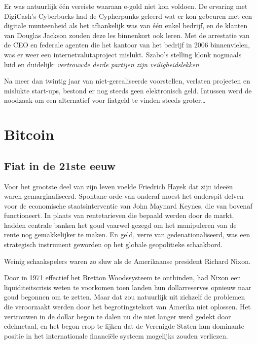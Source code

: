 \documentclass[
  a5paper,
  smalldemyvopaper,11pt,twoside,onecolumn,openright,extrafontsizes,
hidelinks]{memoir}
\begin{document}
Er was natuurlijk één vereiste waaraan e-gold niet kon voldoen. De
ervaring met DigiCash's Cyberbucks had de Cypherpunks geleerd wat er kon
gebeuren met een digitale munteenheid als het afhankelijk was van één
enkel bedrijf, en de klanten van Douglas Jackson zouden deze les
binnenkort ook leren. Met de arrestatie van de CEO en federale agenten
die het kantoor van het bedrijf in 2006 binnenvielen, was er weer een
internetvalutaproject mislukt. Szabo's stelling klonk nogmaals luid en
duidelijk: \emph{vertrouwde derde partijen zijn veiligheidslekken}.

Na meer dan twintig jaar van niet-gerealiseerde voorstellen, verlaten
projecten en mislukte start-ups, bestond er nog steeds geen elektronisch
geld. Intussen werd de noodzaak om een alternatief voor fiatgeld te vinden
steeds groter\ldots{}

\part{Bitcoin}

\chapter{Fiat in de 21ste eeuw}\label{fiat-in-de-21ste-eeuw}

Voor het grootste deel van zijn leven voelde Friedrich Hayek dat zijn
ideeën waren gemarginaliseerd. Spontane orde van onderaf moest het
onderspit delven voor de economische staatsinterventie van John Maynard
Keynes, die van bovenaf functioneert. In plaats van rentetarieven die
bepaald werden door de markt, hadden centrale banken het goud vaarwel
gezegd om het manipuleren van de rente nog gemakkelijker te maken. En
geld, verre van gedenationaliseerd, was een strategisch instrument
geworden op het globale geopolitieke schaakbord.

Weinig schaakspelers waren zo sluw als de Amerikaanse president Richard
Nixon.

Door in 1971 effectief het Bretton Woodssysteem te ontbinden, had Nixon
een liquiditeitscrisis weten te voorkomen toen landen hun dollarreserves
opnieuw naar goud begonnen om te zetten. Maar dat zou natuurlijk uit
zichzelf de problemen die veroorzaakt werden door het begrotingstekort
van Amerika niet oplossen. Het vertrouwen in de dollar begon te dalen nu
die niet langer werd gedekt door edelmetaal, en het begon erop te lijken
dat de Verenigde Staten hun dominante positie in het internationale
financiële systeem mogelijks zouden verliezen.
\end{document}
